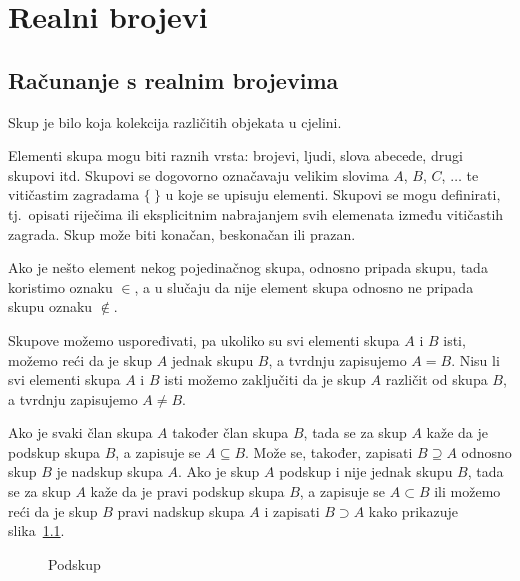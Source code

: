 \chapter{Realni brojevi}\label{ch:realni-brojevi}

\section{Računanje s realnim brojevima}\label{sec:računanje-s-realnim-brojevima}

Skup je bilo koja kolekcija različitih objekata u cjelini.

Elementi skupa mogu biti raznih vrsta: brojevi, ljudi, slova abecede, drugi skupovi itd.
Skupovi se dogovorno označavaju velikim slovima $A$, $B$, $C$, $\ldots$ te vitičastim zagradama $\{\ \}$ u koje se upisuju elementi.
Skupovi se mogu definirati, tj.\ opisati riječima ili eksplicitnim nabrajanjem svih elemenata između vitičastih zagrada.
Skup može biti konačan, beskonačan ili prazan.

Ako je nešto element nekog pojedinačnog skupa, odnosno pripada skupu, tada koristimo oznaku $\in$, a u slučaju da nije element skupa odnosno ne pripada skupu oznaku $\notin$.

Skupove možemo uspoređivati, pa ukoliko su svi elementi skupa $A$ i $B$ isti, možemo reći da je skup $A$ jednak skupu $B$, a tvrdnju zapisujemo $A = B$.
Nisu li svi elementi skupa $A$ i $B$ isti možemo zaključiti da je skup $A$ različit od skupa $B$, a tvrdnju zapisujemo $A \neq B$.

Ako je svaki član skupa $A$ također član skupa $B$, tada se za skup $A$ kaže da je podskup skupa $B$, a zapisuje se $A \subseteq B$.
Može se, također, zapisati $B \supseteq A$ odnosno skup $B$ je nadskup skupa $A$.
Ako je skup $A$ podskup i nije jednak skupu $B$, tada se za skup $A$ kaže da je pravi podskup skupa $B$, a zapisuje se $A \subset B$ ili možemo reći da je skup $B$ pravi nadskup skupa $A$ i zapisati $B \supset A$ kako prikazuje slika~\ref{fig:podskup}.

\begin{figure}
\begin{center}\vspace{0.25cm}
\end{center}
\caption{Podskup}\label{fig:podskup}
\end{figure}

